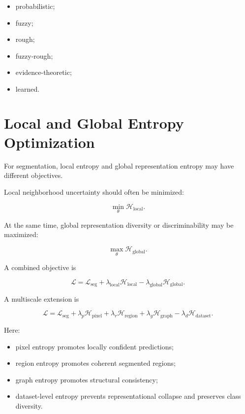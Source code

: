 \documentclass[11pt,oneside]{book}
\theoremstyle{remark}
\newcommand{\Entropy}{\mathcal{H}}
\begin{document}
	\begin{itemize}
		\item probabilistic;
		\item fuzzy;
		\item rough;
		\item fuzzy-rough;
		\item evidence-theoretic;
		\item learned.
	\end{itemize}
	
	\section{Local and Global Entropy Optimization}
	
	For segmentation, local entropy and global representation entropy may have
	different objectives.
	
	Local neighborhood uncertainty should often be minimized:
	
	\[
	\min_{\theta}
	\Entropy_{\mathrm{local}}.
	\]
	
	At the same time, global representation diversity or discriminability may be
	maximized:
	
	\[
	\max_{\theta}
	\Entropy_{\mathrm{global}}.
	\]
	
	A combined objective is
	
	\[
	\mathcal{L}
	=
	\mathcal{L}_{\mathrm{seg}}
	+
	\lambda_{\mathrm{local}}
	\Entropy_{\mathrm{local}}
	-
	\lambda_{\mathrm{global}}
	\Entropy_{\mathrm{global}}.
	\]
	
	A multiscale extension is
	
	\[
	\mathcal{L}
	=
	\mathcal{L}_{\mathrm{seg}}
	+
	\lambda_p\Entropy_{\mathrm{pixel}}
	+
	\lambda_r\Entropy_{\mathrm{region}}
	+
	\lambda_g\Entropy_{\mathrm{graph}}
	-
	\lambda_d\Entropy_{\mathrm{dataset}}.
	\]
	
	Here:
	
	\begin{itemize}
		\item pixel entropy promotes locally confident predictions;
		\item region entropy promotes coherent segmented regions;
		\item graph entropy promotes structural consistency;
		\item dataset-level entropy prevents representational collapse and
		preserves class diversity.
	\end{itemize}
	
	
\end{document}
